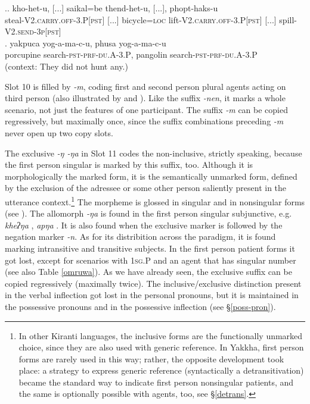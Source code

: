 \ex.\ag. kho-het-u, [...] saikal=be thend-het-u, [...],  phopt-haks-u      \\
steal{\scshape -V2.carry.off-3.P[pst]}  [...] bicycle{\scshape =loc} lift{\scshape -V2.carry.off-3.P[pst]} [...] spill{\scshape -V2.send-3p[pst]}\\
  
\bg. yakpuca   yog-a-ma-c-u, phusa    yog-a-ma-c-u\\
porcupine   search{\scshape -pst-prf-du.A-3.P}, pangolin   search{\scshape -pst-prf-du.A-3.P}\\
 (context: They did not hunt any.) 
	
	Slot  10 is filled by \emph{-m}, coding first and second person plural agents  acting on third person (also illustrated by \LLast[a] and \LLast[c]). Like the suffix \emph{-nen}, it marks a whole scenario, not just the features of one participant. The suffix \emph{-m} can be copied regressively, but maximally once, since the suffix combinations preceding \emph{-m} never open up two copy slots.
	
	
The  exclusive \emph{-ŋ \ti -ŋa} in Slot 11 codes the non-inclusive,  strictly speaking, because the first person singular is marked by this suffix, too. Although it is morphologically the  marked form,  it is the semantically unmarked form, defined by the exclusion of the adressee or some other person saliently present in the utterance context.\footnote{In other Kiranti languages, the inclusive forms are the functionally unmarked choice, since they are also used with generic reference. In Yakkha, first person forms are rarely used in this way; rather, the opposite development took place: a strategy to express generic reference (syntactically a detransitivation) became the standard way to indicate first person nonsingular patients, and the same is optionally possible with agents, too, see §\ref{detrans}.} The morpheme is glossed  in singular and   in nonsingular forms (see \Next). The allomorph \emph{-ŋa} is found in the first person singular subjunctive, e.g. \emph{kheʔŋa} , \emph{apŋa} . It is also found when the exclusive marker is followed by the negation marker \emph{-n}. As for its distribition across the paradigm, it is found marking intransitive and transitive subjects. In the first person patient forms it got lost, except for scenarios with {\scshape 1sg.P}  and an agent that has singular number (see also Table \ref{omruwa}). As we have already seen, the exclusive suffix can be copied regressively (maximally twice). The inclusive/exclusive distinction present in the verbal inflection got lost in the personal pronouns, but it is maintained in the possessive pronouns and in the possessive inflection (see §\ref{poss-pron}). 

